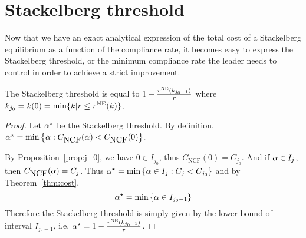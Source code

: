 
\section{Stackelberg threshold}
\label{sec:threshold}

Now that we have an exact analytical expression of the total cost of a Stackelberg equilibrium as a function of the compliance rate, it becomes easy to express the Stackelberg threshold, or the minimum compliance rate the leader needs to control in order to achieve a strict improvement.

\begin{proposition}
\label{prop:thresh}
The Stackelberg threshold is equal to ${ 1 - \frac{r^{\textup{NE}} ( k_{j_0-1} )}{r} }$ where $k_{j_0} = k(0) = \min \{k | r \leq r^{\textup{NE}} ( k )\}$.
\end{proposition}

\begin{proof}
Let $\alpha^\star$ be the Stackelberg threshold. By definition, $\alpha^\star = \min \left\{ \alpha : C_{\mbox{NCF}}(\alpha) < C_{\mbox{NCF}}(0) \right\} $.

By Proposition~\ref{prop:j_0}, we have ${ 0 \in I_{j_0} }$, thus ${ C_{\mbox{NCF}}(0) = C_{j_0} }$. And if $\alpha \in I_j$, then $C_{\mbox{NCF}}(\alpha) = C_j$. Thus ${ \alpha^\star =  \min \left\{ \alpha \in I_j : C_j < C_{j_0} \right\} }$ and by Theorem~\ref{thm:cost},
\[
\alpha^\star = \min \left\{ \alpha \in I_{j_0 - 1} \right\}
\]
Therefore the Stackelberg threshold is simply given by the lower bound of interval $I_{j_0 - 1}$, i.e. $\alpha^\star = 1 - \frac{r^{\textup{NE}} ( k_{j_0-1} )}{r}$.
\end{proof}